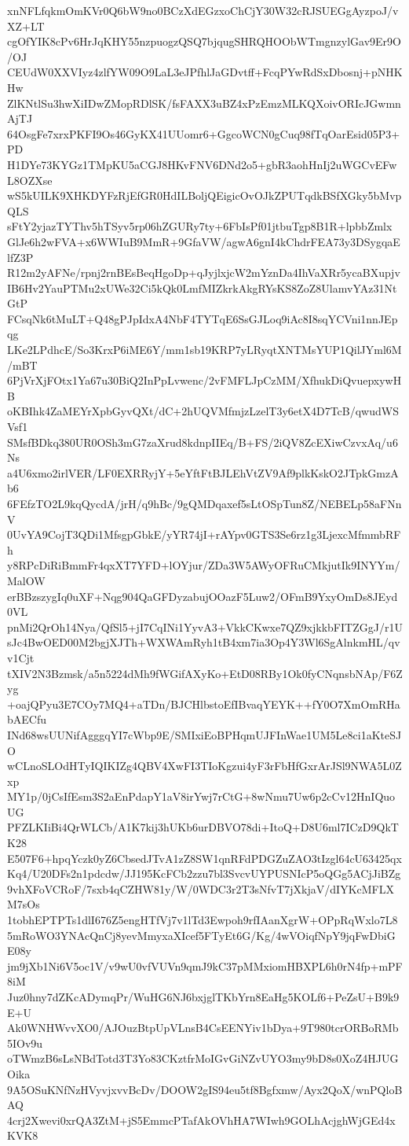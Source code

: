 xnNFLfqkmOmKVr0Q6bW9no0BCzXdEGzxoChCjY30W32cRJSUEGgAyzpoJ/vXZ+LT
cgOfYIK8cPv6HrJqKHY55nzpuogzQSQ7bjqugSHRQHOObWTmgnzylGav9Er9O/OJ
CEUdW0XXVIyz4zlfYW09O9LaL3eJPfhlJaGDvtff+FcqPYwRdSxDbosnj+pNHKHw
ZlKNtlSu3hwXiIDwZMopRDlSK/fsFAXX3uBZ4xPzEmzMLKQXoivORIcJGwmnAjTJ
64OsgFe7xrxPKFI9Os46GyKX41UUomr6+GgcoWCN0gCuq98fTqOarEsid05P3+PD
H1DYe73KYGz1TMpKU5aCGJ8HKvFNV6DNd2o5+gbR3aohHnIj2uWGCvEFwL8OZXse
wS5kUILK9XHKDYFzRjEfGR0HdILBoljQEigicOvOJkZPUTqdkBSfXGky5bMvpQLS
sFtY2yjazTYThv5hTSyv5rp06hZGURy7ty+6FbIsPf01jtbuTgp8B1R+lpbbZmlx
GlJe6h2wFVA+x6WWIuB9MmR+9GfaVW/agwA6gnI4kChdrFEA73y3DSygqaElfZ3P
R12m2yAFNe/rpnj2rnBEsBeqHgoDp+qJyjlxjcW2mYznDa4IhVaXRr5ycaBXupjv
IB6Hv2YauPTMu2xUWe32Ci5kQk0LmfMIZkrkAkgRYsKS8ZoZ8UlamvYAz31NtGtP
FCsqNk6tMuLT+Q48gPJpIdxA4NbF4TYTqE6SsGJLoq9iAc8I8sqYCVni1nnJEpqg
LKe2LPdhcE/So3KrxP6iME6Y/mm1sb19KRP7yLRyqtXNTMsYUP1QilJYml6M/mBT
6PjVrXjFOtx1Ya67u30BiQ2InPpLvwenc/2vFMFLJpCzMM/XfhukDiQvuepxywHB
oKBIhk4ZaMEYrXpbGyvQXt/dC+2hUQVMfmjzLzelT3y6etX4D7TcB/qwudWSVsf1
SMsfBDkq380UR0OSh3mG7zaXrud8kdnpIIEq/B+FS/2iQV8ZcEXiwCzvxAq/u6Ns
a4U6xmo2irlVER/LF0EXRRyjY+5eYftFtBJLEhVtZV9Af9plkKskO2JTpkGmzAb6
6FEfzTO2L9kqQycdA/jrH/q9hBc/9gQMDqaxef5sLtOSpTun8Z/NEBELp58aFNnV
0UvYA9CojT3QDi1MfsgpGbkE/yYR74jI+rAYpv0GTS3Se6rz1g3LjexcMfmmbRFh
y8RPcDiRiBmmFr4qxXT7YFD+lOYjur/ZDa3W5AWyOFRuCMkjutIk9INYYm/MalOW
erBBzszygIq0uXF+Nqg904QaGFDyzabujOOazF5Luw2/OFmB9YxyOmDs8JEyd0VL
pnMi2QrOh14Nya/QfSl5+jI7CqINi1YyvA3+VkkCKwxe7QZ9xjkkbFITZGgJ/r1U
sJc4BwOED00M2bgjXJTh+WXWAmRyh1tB4xm7ia3Op4Y3Wl6SgAlnkmHL/qvv1Cjt
tXIV2N3Bzmsk/a5n5224dMh9fWGifAXyKo+EtD08RBy1Ok0fyCNqnsbNAp/F6Zyg
+oajQPyu3E7COy7MQ4+aTDn/BJCHlbstoEfIBvaqYEYK++fY0O7XmOmRHabAECfu
INd68wsUUNifAgggqYI7cWbp9E/SMIxiEoBPHqmUJFInWae1UM5Le8ci1aKteSJO
wCLnoSLOdHTyIQIKIZg4QBV4XwFI3TIoKgzui4yF3rFbHfGxrArJSl9NWA5L0Zxp
MY1p/0jCsIfEsm3S2aEnPdapY1aV8irYwj7rCtG+8wNmu7Uw6p2cCv12HnIQuoUG
PFZLKIiBi4QrWLCb/A1K7kij3hUKb6urDBVO78di+ItoQ+D8U6ml7ICzD9QkTK28
E507F6+hpqYczk0yZ6CbsedJTvA1zZ8SW1qnRFdPDGZuZAO3tIzgl64cU63425qx
Kq4/U20DFs2n1pdcdw/JJ195KcFCb2zzu7bl3SvcvUYPUSNIcP5oQGg5ACjJiBZg
9vhXFoVCRoF/7sxb4qCZHW81y/W/0WDC3r2T3sNfvT7jXkjaV/dIYKcMFLXM7sOs
1tobhEPTPTs1dlI676Z5engHTfVj7v1lTd3Ewpoh9rfIAanXgrW+OPpRqWxlo7L8
5mRoWO3YNAcQnCj8yevMmyxaXIcef5FTyEt6G/Kg/4wVOiqfNpY9jqFwDbiGE08y
jm9jXb1Ni6V5oc1V/v9wU0vfVUVn9qmJ9kC37pMMxiomHBXPL6h0rN4fp+mPF8iM
Juz0hny7dZKcADymqPr/WuHG6NJ6bxjglTKbYrn8EaHg5KOLf6+PeZsU+B9k9E+U
Ak0WNHWvvXO0/AJOuzBtpUpVLnsB4CsEENYiv1bDya+9T980tcrORBoRMb5IOv9u
oTWmzB6sLsNBdTotd3T3Yo83CKztfrMoIGvGiNZvUYO3my9bD8s0XoZ4HJUGOika
9A5OSuKNfNzHVyvjxvvBcDv/DOOW2gIS94eu5tf8Bgfxmw/Ayx2QoX/wnPQloBAQ
4crj2Xwevi0xrQA3ZtM+jS5EmmcPTafAkOVhHA7WIwh9GOLhAcjghWjGEd4xKVK8
